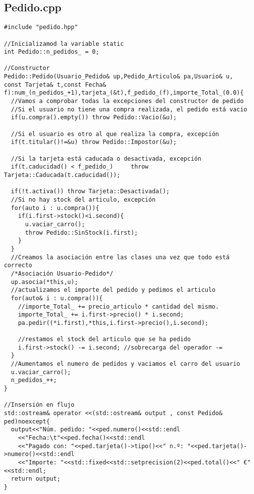 \subsection{Pedido.cpp}
\begin{verbatim}
#include "pedido.hpp"

//Inicializamod la variable static
int Pedido::n_pedidos_ = 0;

//Constructor
Pedido::Pedido(Usuario_Pedido& up,Pedido_Articulo& pa,Usuario& u, const Tarjeta& t,const Fecha& f):num_(n_pedidos_+1),tarjeta_(&t),f_pedido_(f),importe_Total_(0.0){
  //Vamos a comprobar todas la excepciones del constructor de pedido
  //Si el usuario no tiene una compra realizada, el pedido está vacio
  if(u.compra().empty()) throw Pedido::Vacio(&u);

  //Si el usuario es otro al que realiza la compra, excepción
  if(t.titular()!=&u) throw Pedido::Impostor(&u);

  //Si la tarjeta está caducada o desactivada, excepción
  if(t.caducidad() < f_pedido_) 	throw Tarjeta::Caducada(t.caducidad());

  if(!t.activa()) throw Tarjeta::Desactivada();
  //Si no hay stock del articulo, excepción
  for(auto i : u.compra()){
    if(i.first->stock()<i.second){
      u.vaciar_carro();
      throw Pedido::SinStock(i.first);
    }
  }
  //Creamos la asociación entre las clases una vez que todo está correcto
  /*Asociación Usuario-Pedido*/
  up.asocia(*this,u);
  //actualizamos el importe del pedido y pedimos el articulo
  for(auto& i : u.compra()){
    //importe_Total_ += precio_articulo * cantidad del mismo.
    importe_Total_ += i.first->precio() * i.second;
    pa.pedir((*i.first),*this,i.first->precio(),i.second);

    //restamos el stock del articulo que se ha pedido
    i.first->stock() -= i.second; //sobrecarga del operador -=
  }
  //Aumentamos el numero de pedidos y vaciamos el carro del usuario
  u.vaciar_carro();
  n_pedidos_++;
}

//Insersión en flujo
std::ostream& operator <<(std::ostream& output , const Pedido& ped)noexcept{
  output<<"Núm. pedido: "<<ped.numero()<<std::endl
    <<"Fecha:\t"<<ped.fecha()<<std::endl
    <<"Pagado con: "<<ped.tarjeta()->tipo()<<" n.º: "<<ped.tarjeta()->numero()<<std::endl
    <<"Importe: "<<std::fixed<<std::setprecision(2)<<ped.total()<<" €"<<std::endl;
  return output;
}
  
\end{verbatim}

